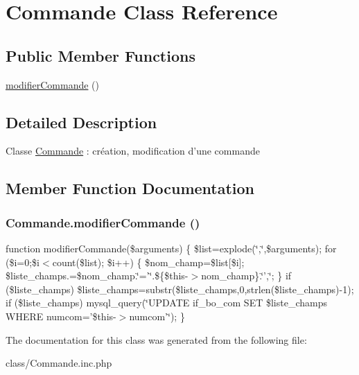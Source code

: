 \hypertarget{class_commande}{
\section{Commande Class Reference}
\label{class_commande}
}
\subsection*{Public Member Functions}
\begin{DoxyCompactItemize}
\item 
\hyperlink{class_commande_aa4ac905148cf0fe4ba0accb77c0fc43e}{modifierCommande} ()
\end{DoxyCompactItemize}


\subsection{Detailed Description}
Classe \hyperlink{class_commande}{Commande} : création, modification d'une commande 

\subsection{Member Function Documentation}
\hypertarget{class_commande_aa4ac905148cf0fe4ba0accb77c0fc43e}{
\subsubsection[{modifierCommande}]{\setlength{\rightskip}{0pt plus 5cm}Commande.modifierCommande ()}}
\label{class_commande_aa4ac905148cf0fe4ba0accb77c0fc43e}
function modifierCommande(\$arguments) \{ \$list=explode(\char`\"{},\char`\"{},\$arguments); for (\$i=0;\$i$<$count(\$list); \$i++) \{ \$nom\_\-champ=\$list\mbox{[}\$i\mbox{]}; \$liste\_\-champs.=\$nom\_\-champ.\char`\"{}='\char`\"{}.\$\{\$this-\/$>$nom\_\-champ\}.\char`\"{}',\char`\"{}; \} if (\$liste\_\-champs) \$liste\_\-champs=substr(\$liste\_\-champs,0,strlen(\$liste\_\-champs)-\/1); if (\$liste\_\-champs) mysql\_\-query(\char`\"{}UPDATE if\_\-bo\_\-com SET \$liste\_\-champs WHERE numcom='\$this-\/$>$numcom'\char`\"{}); \} 

The documentation for this class was generated from the following file:\begin{DoxyCompactItemize}
\item 
class/Commande.inc.php\end{DoxyCompactItemize}
